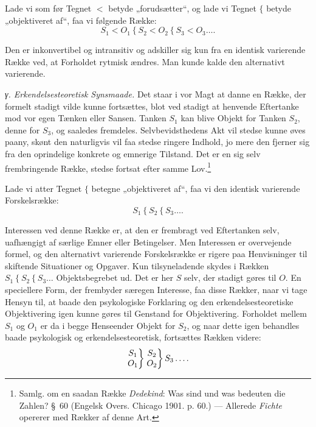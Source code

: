 \documentclass[12pt,a4paper]{book}
\newcommand{\apage}[1]{\marginnote{\footnotesize\textit{[#1]}}}
\begin{document}
Lade vi som før Tegnet $<$ betyde „forudsætter“, og lade vi Tegnet $\{$ betyde
„objektiveret af“, faa vi følgende Række:
\[ S_1 < O_1 \mathrel{\{} S_2 < O_2 \mathrel{\{} S_3 < O_3 \ldots. \]

Den er inkonvertibel og intransitiv og adskiller sig kun fra en identisk varierende
Række ved, at Forholdet rytmisk ændres. Man kunde kalde den alternativt varierende.

\emph{γ. Erkendelsesteoretisk Synsmaade.} Det staar i vor Magt at danne en Række, der
formelt stadigt vilde kunne fortsættes, blot ved stadigt at henvende Eftertanke mod
vor egen Tænken eller Sansen. Tanken $S_1$ kan blive Objekt for Tanken $S_2$, denne
for $S_3$, og saaledes fremdeles. Selvbevidsthedens Akt vil stedse kunne øves paany,
skønt den naturligvis vil faa stedse ringere Indhold, jo mere den fjerner sig fra den \apage{300}
oprindelige konkrete og emnerige Tilstand. Det er en sig selv frembringende Række,
stedse fortsat efter samme Lov.\footnote{Samlg. om en saadan Række \emph{Dedekind}:
Was sind und was bedeuten die Zahlen? \S\ 60 (Engelsk Overs. Chicago 1901. p. 60.)
--- Allerede \emph{Fichte} opererer med Rækker af denne Art.}

Lade vi atter Tegnet $\{$ betegne „objektiveret af“, faa vi den identisk varierende
Forskelsrække:
\[ S_1 \mathrel{\{} S_2 \mathrel{\{} S_3 \ldots. \]

Interessen ved denne Række er, at den er frembragt ved Eftertanken selv, uafhængigt af
særlige Emner eller Betingelser. Men Interessen er overvejende formel, og den
alternativt varierende Forskelsrække er rigere paa Henvisninger til skiftende
Situationer og Opgaver. Kun tilsyneladende skydes i Rækken $S_1 \mathrel{\{} S_2
\mathrel{\{} S_3 \ldots$ Objektsbegrebet ud. Det er her $S$ selv, der stadigt gøres til
$O$. En speciellere Form, der frembyder særegen Interesse, faa disse Rækker, naar vi
tage Hensyn til, at baade den psykologiske Forklaring og den erkendelsesteoretiske
Objektivering igen kunne gøres til Genstand for Objektivering. Forholdet mellem $S_1$
og $O_1$ er da i begge Henseender Objekt for $S_2$, og naar dette igen behandles baade
psykologisk og erkendelsesteoretisk, fortsættes Rækken videre:
\[ \left.\begin{array}{@{}c@{}} S_1 \\ O_1 \end{array}\right\}
   \left.\begin{array}{@{}c@{}} S_2 \\ O_2 \end{array}\right\}
   S_3 \ldots. \]
\end{document}
